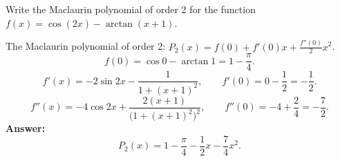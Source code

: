 
\begin{question}
Write the Maclaurin polynomial of order 2 for the function $f(x)=\cos(2x)-\arctan(x+1)$.
\end{question}

\begin{solution}
The Maclaurin polynomial of order 2: $P_2(x)=f(0)+f'(0)x+\frac{f''(0)}{2}x^2$.
\[
f(0)=\cos0-\arctan1=1-\frac\pi4.
\]
\[
f'(x)=-2\sin2x-\frac{1}{1+(x+1)^2},\qquad f'(0)=0-\frac12=-\frac12.
\]
\[
f''(x)=-4\cos2x+\frac{2(x+1)}{\big(1+(x+1)^2\big)^2},\qquad f''(0)=-4+\frac{2}{4}=-\frac72.
\]
\textbf{Answer:}
\[
P_2(x)=1-\frac\pi4-\frac12x-\frac74x^2.
\]
\end{solution}
